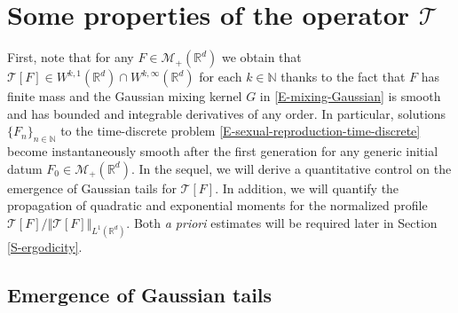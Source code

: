\documentclass[reqno]{amsart}
\numberwithin{equation}{section}
\begin{document}
{\section{Some properties of the operator $\mathcal{T}$}\label{S-properties-operator-T}

First, note that for any $F\in \mathcal{M}_+(\mathbb{R}^d)$ we obtain that $\mathcal{T}[F]\in W^{k,1}(\mathbb{R}^d)\cap W^{k,\infty}(\mathbb{R}^d)$ for each $k\in \mathbb{N}$ thanks to the fact that $F$ has finite mass and the Gaussian mixing kernel $G$ in \eqref{E-mixing-Gaussian} is smooth and has bounded and integrable derivatives of any order. In particular, solutions $\{F_n\}_{n\in \mathbb{N}}$ to the time-discrete problem \eqref{E-sexual-reproduction-time-discrete} become instantaneously smooth after the first generation for any generic initial datum $F_0\in \mathcal{M}_+(\mathbb{R}^d)$. In the sequel, we will derive a quantitative control on the emergence of Gaussian tails for $\mathcal{T}[F]$. In addition, we will quantify the propagation of quadratic and exponential moments for the normalized profile $\mathcal{T}[F]/\Vert \mathcal{T}[F]\Vert_{L^1(\mathbb{R}^d)}$. Both {\em a priori} estimates will be required later in Section \ref{S-ergodicity}.


\subsection{Emergence of Gaussian tails}

}
\end{document}
